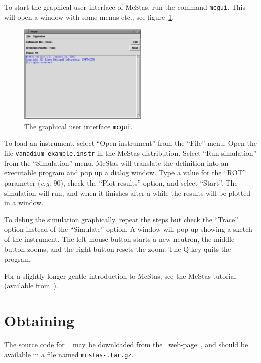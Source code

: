 To start the graphical user interface of McStas, run the command
\verb+mcgui+. This will open a window with some menus etc.,
see figure~\ref{fig:mcgui}. 
\begin{figure}[th]
  \begin{center}
    \includegraphics[width=0.55\textwidth]{figures/mcgui.eps}
  \end{center}
\caption{The graphical user interface \texttt{mcgui}.}
\label{fig:mcgui}
\end{figure}

To load an instrument, select ``Open instrument'' from the ``File''
menu. Open the file \verb+vanadium_example.instr+ in the McStas
distribution. Select ``Run simulation'' from the ``Simulation'' menu.
McStas will translate the definition into an executable program and pop
up a dialog window. Type a value for the ``ROT'' parameter ({\em e.g.}
90), check the ``Plot results'' option, and select ``Start''. The
simulation will run, and when it finishes after a while the results will
be plotted in a window.

To debug the simulation graphically, repeat the
steps but check the ``Trace'' option instead of the ``Simulate'' option.
A window will pop up showing a sketch of the instrument.
The left mouse button starts a new neutron, the middle button zooms, and
the right button resets the zoom. The Q key quits the program.

For a slightly longer gentle introduction to McStas, see the McStas
tutorial (available from~\cite{mcstas_webpage}).

\section{Obtaining \MCS}
\label{s:obtain}

The source code for \MCS\ 
may be downloaded from the \MCS\ web-page~\cite{mcstas_webpage}, and 
should be available in a file named
\verb+mcstas-+\version\verb+.tar.gz+.

